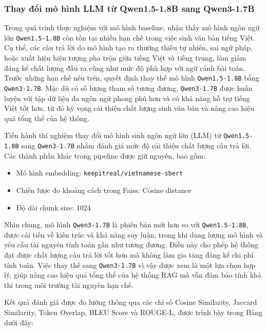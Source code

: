 \subsubsection{Thay đổi mô hình LLM từ Qwen1.5-1.8B sang Qwen3-1.7B}

Trong quá trình thực nghiệm với mô hình baseline, nhận thấy mô hình ngôn ngữ lớn \texttt{Qwen1.5-1.8B}
còn tồn tại nhiều hạn chế trong việc sinh văn bản tiếng Việt. Cụ thể, các câu trả lời do mô hình
tạo ra thường thiếu tự nhiên, sai ngữ pháp, hoặc xuất hiện hiện tượng pha trộn giữa tiếng Việt
và tiếng trung, làm giảm đáng kể chất lượng đầu ra cũng như mức độ phù hợp với ngữ cảnh bài
toán.
Trước những hạn chế nêu trên, quyết định thay thế mô hình \texttt{Qwen1.5-1.8B} bằng \texttt{Qwen3-1.7B}.
Mặc dù có số lượng tham số tương đương, \texttt{Qwen3-1.7B} được huấn luyện với tập dữ liệu đa ngôn
ngữ phong phú hơn và có khả năng hỗ trợ tiếng Việt tốt hơn, từ đó kỳ vọng cải thiện chất lượng
sinh văn bản và nâng cao hiệu quả tổng thể của hệ thống.
 
Tiến hành thí nghiệm thay đổi mô hình sinh ngôn ngữ lớn (LLM) từ \texttt{Qwen1.5-1.8B} sang
\texttt{Qwen3-1.7B} nhằm đánh giá mức độ cải thiện chất lượng câu trả lời. Các thành phần khác trong
pipeline được giữ nguyên, bao gồm:
 
\begin{itemize}
    \item Mô hình embedding: \texttt{keepitreal/vietnamese-sbert}
    \item Chiến lược đo khoảng cách trong Faiss: Cosine distance
    \item Độ dài chunk size: 1024
\end{itemize}
 
Nhìn chung, mô hình \texttt{Qwen3-1.7B} là phiên bản mới hơn so với \texttt{Qwen1.5-1.8B}, được cải tiến
về kiến trúc và khả năng suy luận, trong khi dung lượng mô hình và yêu cầu tài nguyên tính
toán gần như tương đương. Điều này cho phép hệ thống đạt được chất lượng câu trả lời tốt hơn
mà không làm gia tăng đáng kể chi phí tính toán. Việc thay thế sang \texttt{Qwen3-1.7B} vì vậy được
xem là một lựa chọn hợp lý, giúp nâng cao hiệu quả tổng thể của hệ thống RAG mà vẫn đảm
bảo tính khả thi trong môi trường tài nguyên hạn chế.
 
Kết quả đánh giá được đo lường thông qua các chỉ số Cosine Similarity, Jaccard Similarity,
Token Overlap, BLEU Score và ROUGE-L, được trình bày trong Bảng dưới đây:

